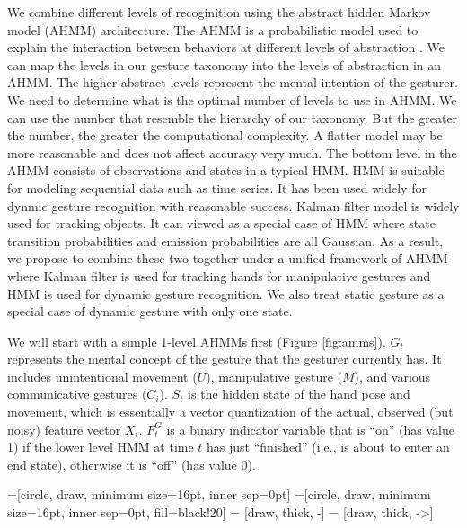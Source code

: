We combine different levels of recoginition using the abstract hidden Markov
model (AHMM) architecture. The AHMM is a probabilistic model used to explain the
interaction between behaviors at different levels of abstraction \cite{johns05}.
We can map the levels in our gesture taxonomy into the levels of abstraction in
an AHMM. The higher abstract levels represent the mental intention of the
gesturer. We need to determine what is the optimal number of levels to use in
AHMM. We can use the number that resemble the hierarchy of our taxonomy. But the
greater the number, the greater the computational complexity. A flatter model
may be more reasonable and does not affect accuracy very much. The bottom level in the
AHMM consists of observations and states in a typical HMM. HMM is
suitable for modeling sequential data such as time series. It has been used widely for dynmic gesture recognition with reasonable 
success. Kalman filter model is widely used for tracking objects. It can viewed 
as a special case of HMM where state transition probabilities and emission 
probabilities are all Gaussian. As a result, we propose to combine these two 
together under a unified framework of AHMM where Kalman filter is used for 
tracking hands for manipulative gestures and HMM is used for dynamic gesture 
recognition. We also treat static gesture as a special case of dynamic gesture 
with only one state.

We will start with a simple 1-level AHMMs \cite{murphy02} first (Figure
\ref{fig:amms}). $G_t$ represents the mental concept of the gesture that the
gesturer currently has. It includes unintentional movement ($U$), manipulative gesture ($M$), and various
communicative gestures ($C_i$). $S_t$ is the hidden state of the hand pose and
movement, which is essentially a vector quantization of the actual, observed 
(but noisy) feature vector $X_t$. $F_t^G$ is a binary indicator variable that is
``on'' (has value 1) if the lower level HMM at time $t$ has just ``finished''
(i.e., is about to enter an end state), otherwise it is ``off'' (has value 0).

=[circle, draw, minimum size=16pt, inner sep=0pt]
=[circle, draw, minimum size=16pt, inner sep=0pt,
							 fill=black!20] 
 = [draw, thick, -]
 = [draw, thick, ->]

